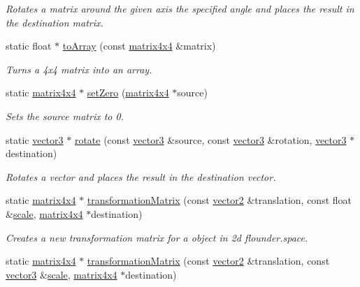\begin{DoxyCompactItemize}
\begin{DoxyCompactList}\small\item\em Rotates a matrix around the given axis the specified angle and places the result in the destination matrix. \end{DoxyCompactList}\item 
static float $\ast$ \hyperlink{classflounder_1_1matrix4x4_a5eaea900736fe16138c0380b4e9c4786}{to\+Array} (const \hyperlink{classflounder_1_1matrix4x4}{matrix4x4} \&matrix)
\begin{DoxyCompactList}\small\item\em Turns a 4x4 matrix into an array. \end{DoxyCompactList}\item 
static \hyperlink{classflounder_1_1matrix4x4}{matrix4x4} $\ast$ \hyperlink{classflounder_1_1matrix4x4_ab9f73c85d8b8844435858aafbf99d5d7}{set\+Zero} (\hyperlink{classflounder_1_1matrix4x4}{matrix4x4} $\ast$source)
\begin{DoxyCompactList}\small\item\em Sets the source matrix to 0. \end{DoxyCompactList}\item 
static \hyperlink{classflounder_1_1vector3}{vector3} $\ast$ \hyperlink{classflounder_1_1matrix4x4_abdc18b84f279431e1c137a7dd42cac2b}{rotate} (const \hyperlink{classflounder_1_1vector3}{vector3} \&source, const \hyperlink{classflounder_1_1vector3}{vector3} \&rotation, \hyperlink{classflounder_1_1vector3}{vector3} $\ast$destination)
\begin{DoxyCompactList}\small\item\em Rotates a vector and places the result in the destination vector. \end{DoxyCompactList}\item 
static \hyperlink{classflounder_1_1matrix4x4}{matrix4x4} $\ast$ \hyperlink{classflounder_1_1matrix4x4_a48a7a03e0cf3618a745cb9265b15575f}{transformation\+Matrix} (const \hyperlink{classflounder_1_1vector2}{vector2} \&translation, const float \&\hyperlink{classflounder_1_1matrix4x4_a5ac6ac7707c5e5c01654303b5b13c3ba}{scale}, \hyperlink{classflounder_1_1matrix4x4}{matrix4x4} $\ast$destination)
\begin{DoxyCompactList}\small\item\em Creates a new transformation matrix for a object in 2d flounder.\+space. \end{DoxyCompactList}\item 
static \hyperlink{classflounder_1_1matrix4x4}{matrix4x4} $\ast$ \hyperlink{classflounder_1_1matrix4x4_aee27febd58dbb352bc3c3b21927981b2}{transformation\+Matrix} (const \hyperlink{classflounder_1_1vector2}{vector2} \&translation, const \hyperlink{classflounder_1_1vector3}{vector3} \&\hyperlink{classflounder_1_1matrix4x4_a5ac6ac7707c5e5c01654303b5b13c3ba}{scale}, \hyperlink{classflounder_1_1matrix4x4}{matrix4x4} $\ast$destination)

\end{DoxyCompactItemize}

